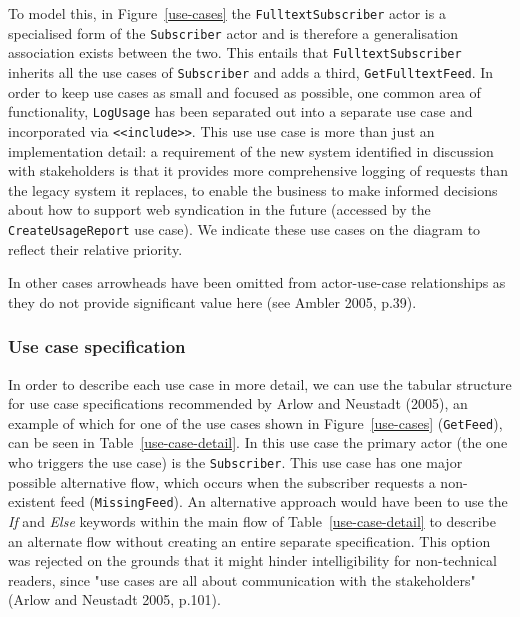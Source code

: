 \documentclass{article}
\begin{document}
To model this, in Figure~\ref{use-cases} the \texttt{FulltextSubscriber} actor is a specialised form of the \texttt{Subscriber} actor and is therefore a generalisation association exists between the two. This entails that \texttt{FulltextSubscriber} inherits all the use cases of \texttt{Subscriber} and adds a third, \texttt{GetFulltextFeed}. In order to keep use cases as small and focused as possible, one common area of functionality, \texttt{LogUsage} has been separated out into a separate use case and incorporated via \texttt{<<include>>}. This use use case is more than just an implementation detail: a requirement of the new system identified in discussion with stakeholders is that it provides more comprehensive logging of requests than the legacy system it replaces, to enable the business to make informed decisions about how to support web syndication in the future (accessed by the \texttt{CreateUsageReport} use case). We indicate these use cases on the diagram to reflect their relative priority.

In other cases arrowheads have been omitted from actor-use-case relationships as they do not provide significant value here (see Ambler 2005, p.39).

\subsubsection{Use case specification}

In order to describe each use case in more detail, we can use the tabular structure for use case specifications recommended by Arlow and Neustadt (2005), an example of which for one of the use cases shown in Figure~\ref{use-cases} (\texttt{GetFeed}), can be seen in Table~\ref{use-case-detail}. In this use case the primary actor (the one who triggers the use case) is the \texttt{Subscriber}. This use case has one major possible alternative flow, which occurs when the subscriber requests a non-existent feed (\texttt{MissingFeed}). An alternative approach would have been to use the \textit{If} and \textit{Else} keywords within the main flow of Table~\ref{use-case-detail} to describe an alternate flow without creating an entire separate specification. This option was rejected on the grounds that it might hinder intelligibility for non-technical readers, since "use cases are all about communication with the stakeholders" (Arlow and Neustadt 2005, p.101).

\end{document}
